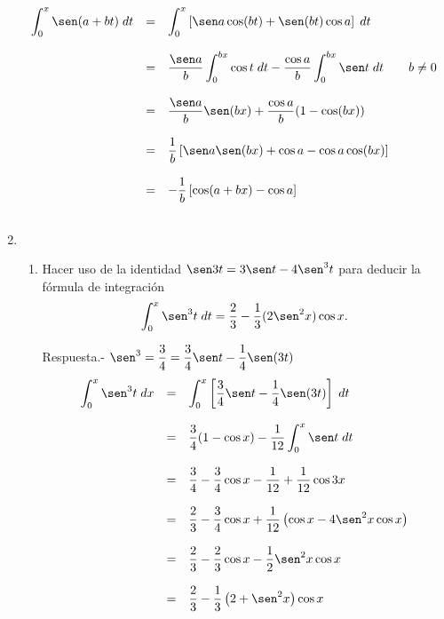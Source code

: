 \begin{enumerate}[\bfseries 1.]
	 $$\begin{array}{rcl}
	     \displaystyle\int_0^x \sen(a+bt)\; dt&=&\displaystyle\int_0^x \left[\sen a \cos(bt)+\sen(bt)\cos a\right]\; dt\\\\
						  &=&\dfrac{\sen a}{b} \displaystyle\int_0^{bx} \cos t \; dt - \dfrac{\cos a}{b}\int_0^{bx} \sen t \; dt \qquad b\neq 0\\\\
						  &=&\dfrac{\sen a}{b}\sen(bx)+\dfrac{\cos a}{b}(1-\cos(bx))\\\\
						  &=&\dfrac{1}{b}\left[\sen a \sen (bx) + \cos a - \cos a \cos (bx)\right]\\\\
						  &=&-\dfrac{1}{b} \left[\cos(a+bx)-\cos a\right]\\\\
	 \end{array}$$

\item 
    \begin{enumerate}[\bfseries (a)]

	\item Hacer uso de la identidad $\sen 3t = 3 \sen t  - 4 \sen^3 t$ para deducir la fórmula de integración
	    $$\int_0^x \sen^3 t \;dt = \frac{2}{3} - \frac{1}{3}(2\sen^2x)\cos x.$$

	    Respuesta.-\; $\sen^3 = \dfrac{3}{4} = \dfrac{3}{4}\sen t - \dfrac{1}{4}\sen(3t)$
	    $$ \begin{array}{rcl}
		\displaystyle\int_0^x \sen^3 t \; dx&=&\displaystyle \int_0^x\left[\dfrac{3}{4}\sen t - \dfrac{1}{4}\sen (3t)\right]\; dt\\\\
						    &=&\dfrac{3}{4}(1-\cos x)-\dfrac{1}{12}\displaystyle \int_0^x \sen t \; dt\\\\
						    &=&\dfrac{3}{4} - \dfrac{3}{4}\cos x - \dfrac{1}{12}+\dfrac{1}{12} \cos 3x\\\\
						    &=&\dfrac{2}{3}-\dfrac{3}{4}\cos x + \dfrac{1}{12}\left(\cos x  - 4\sen^2 x \cos x\right)\\\\
						    &=&\dfrac{2}{3}-\dfrac{2}{3}\cos x - \dfrac{1}{2}\sen^2 x \cos x\\\\
						    &=&\dfrac{2}{3}-\dfrac{1}{3}\left(2+\sen^2 x\right)\cos x\\\\
	    \end{array}$$


\end{enumerate}
\end{enumerate}
